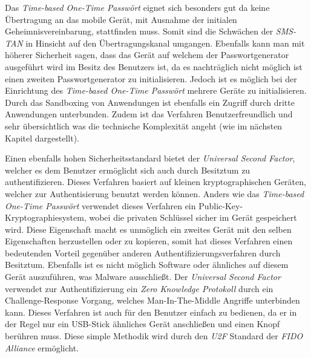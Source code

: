 \documentclass[11pt,a4paper,ngerman]{scrreprt}
\begin{document}
Das \textit{Time-based One-Time Passwört} eignet sich besonders gut da keine Übertragung an das mobile Gerät, mit Ausnahme der initialen Geheimnisvereinbarung, stattfinden muss. Somit sind die Schwächen der \textit{SMS-TAN} in Hinsicht auf den Übertragungskanal umgangen. Ebenfalls kann man mit höherer Sicherheit sagen, dass das Gerät auf welchem der Passwortgenerator ausgeführt wird im Besitz des Benutzers ist, da es nachträglich nicht möglich ist einen zweiten Passwortgenerator zu initialisieren. Jedoch ist es möglich bei der Einrichtung des \textit{Time-based One-Time Passwört} mehrere Geräte zu initialisieren. Durch das Sandboxing von Anwendungen ist ebenfalls ein Zugriff durch dritte Anwendungen unterbunden. Zudem ist das Verfahren Benutzerfreundlich und sehr übersichtlich was die technische Komplexität angeht (wie im nächsten Kapitel dargestellt).

Einen ebenfalls hohen Sicherheitsstandard bietet der \textit{Universal Second Factor}, welcher es dem Benutzer ermöglicht sich auch durch Besitztum zu authentifizieren. Dieses Verfahren basiert auf kleinen kryptographischen Geräten, welcher zur Authentisierung benutzt werden können. Anders wie das \textit{Time-based One-Time Passwört} verwendet dieses Verfahren ein Public-Key-Kryptographiesystem, wobei die privaten Schlüssel sicher im Gerät gespeichert wird. Diese Eigenschaft macht es unmöglich ein zweites Gerät mit den selben Eigenschaften herzustellen oder zu kopieren, somit hat dieses Verfahren einen bedeutenden Vorteil gegenüber anderen Authentifizierungsverfahren durch Besitztum. Ebenfalls ist es nicht möglich Software oder ähnliches auf diesem Gerät auszuführen, was Malware ausschließt. Der \textit{Universal Second Factor} verwendet zur Authentifizierung ein \textit{Zero Knowledge Protokoll} durch ein Challenge-Response Vorgang, welches Man-In-The-Middle Angriffe unterbinden kann. Dieses Verfahren ist auch für den Benutzer einfach zu bedienen, da er in der Regel nur ein USB-Stick ähnliches Gerät anschließen und einen Knopf berühren muss. Diese simple Methodik wird durch den \textit{U2F} Standard der \textit{FIDO Alliance} ermöglicht.
\end{document}
